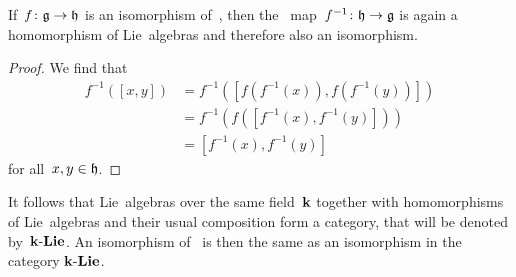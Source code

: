 \begin{lemma}
 If~$f \colon \mathfrak{g} \to \mathfrak{h}$ is an isomorphism of~{\liealgebras{$\kf$}}, then the~{\linear{$\kf$}} map~$f^{-1} \colon \mathfrak{h} \to \mathfrak{g}$ is again a homomorphism of Lie~algebras and therefore also an isomorphism.
\end{lemma}


\begin{proof}
 We find that
 \begin{align*}
  f^{-1}( [x,y] )
  &=
  f^{-1}( [ f(f^{-1}(x)), f(f^{-1}(y)) ] ) \\
  &=
  f^{-1}(f( [f^{-1}(x), f^{-1}(y)] )) \\
  &=
  [f^{-1}(x), f^{-1}(y)]
 \end{align*}
 for all~$x, y \in \mathfrak{h}$.
\end{proof}


\begin{remark}
 It follows that Lie~algebras over the same field~$\kf$ together with homomorphisms of Lie~algebras and their usual composition form a category, that will be denoted by~$\mathbf{k}\text{-}\mathbf{Lie}$.
 An isomorphism of~{\liealgebras{$\kf$}} is then the same as an isomorphism in the category $\mathbf{k}\text{-}\mathbf{Lie}$.
\end{remark}


